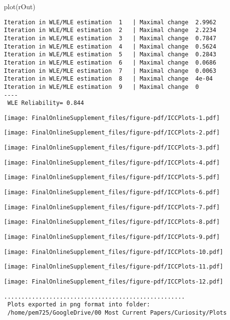 \documentclass[
  letterpaper,
  DIV=11,
  numbers=noendperiod]{scrartcl}
\newenvironment{Shaded}{\begin{snugshade}}{\end{snugshade}}
\newcommand{\FunctionTok}[1]{\textcolor[rgb]{0.28,0.35,0.67}{#1}}
\newcommand{\NormalTok}[1]{\textcolor[rgb]{0.00,0.23,0.31}{#1}}
\begin{document}
\begin{Shaded}
\begin{Highlighting}[]
\FunctionTok{plot}\NormalTok{(rOut)}
\end{Highlighting}
\end{Shaded}

\begin{verbatim}
Iteration in WLE/MLE estimation  1   | Maximal change  2.9962 
Iteration in WLE/MLE estimation  2   | Maximal change  2.2234 
Iteration in WLE/MLE estimation  3   | Maximal change  0.7847 
Iteration in WLE/MLE estimation  4   | Maximal change  0.5624 
Iteration in WLE/MLE estimation  5   | Maximal change  0.2843 
Iteration in WLE/MLE estimation  6   | Maximal change  0.0686 
Iteration in WLE/MLE estimation  7   | Maximal change  0.0063 
Iteration in WLE/MLE estimation  8   | Maximal change  4e-04 
Iteration in WLE/MLE estimation  9   | Maximal change  0 
----
 WLE Reliability= 0.844 
\end{verbatim}

\texttt{[image: FinalOnlineSupplement\_files/figure-pdf/ICCPlots-1.pdf]}

\texttt{[image: FinalOnlineSupplement\_files/figure-pdf/ICCPlots-2.pdf]}

\texttt{[image: FinalOnlineSupplement\_files/figure-pdf/ICCPlots-3.pdf]}

\texttt{[image: FinalOnlineSupplement\_files/figure-pdf/ICCPlots-4.pdf]}

\texttt{[image: FinalOnlineSupplement\_files/figure-pdf/ICCPlots-5.pdf]}

\texttt{[image: FinalOnlineSupplement\_files/figure-pdf/ICCPlots-6.pdf]}

\texttt{[image: FinalOnlineSupplement\_files/figure-pdf/ICCPlots-7.pdf]}

\texttt{[image: FinalOnlineSupplement\_files/figure-pdf/ICCPlots-8.pdf]}

\texttt{[image: FinalOnlineSupplement\_files/figure-pdf/ICCPlots-9.pdf]}

\texttt{[image: FinalOnlineSupplement\_files/figure-pdf/ICCPlots-10.pdf]}

\texttt{[image: FinalOnlineSupplement\_files/figure-pdf/ICCPlots-11.pdf]}

\texttt{[image: FinalOnlineSupplement\_files/figure-pdf/ICCPlots-12.pdf]}

\begin{verbatim}
....................................................
 Plots exported in png format into folder:
 /home/pem725/GoogleDrive/00 Most Current Papers/Curiosity/Plots
\end{verbatim}
\end{document}
